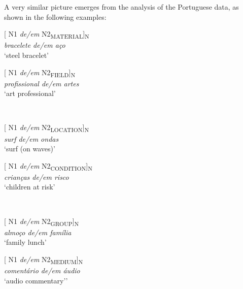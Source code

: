\documentclass[output=paper]{langsci/langscibook}
\begin{document}
A very similar picture emerges from the analysis of the Portuguese data, as shown in the following examples:\\


\begin{minipage}{0.4\textwidth}    %
[ N1 \textit{de/em} N2\textsubscript{MATERIAL}]\textsubscript{N}\\
\textit{bracelete de/em aço}\\
`steel bracelet'
\end{minipage}
\hfill            %
\begin{minipage}{0.4\textwidth}
[ N1 \textit{de/em} N2\textsubscript{FIELD}]\textsubscript{N}\\
\textit{profissional de/em artes}\\
`art professional'
\end{minipage} \\
\hfill  
\vspace{0.5cm}

\begin{minipage}{0.4\textwidth}    %
[ N1 \textit{de/em} N2\textsubscript{LOCATION}]\textsubscript{N}\\
\textit{surf de/em ondas }\\
`surf (on waves)'
\end{minipage}
\hfill            %
\begin{minipage}{0.4\textwidth}
[ N1 \textit{de/em} N2\textsubscript{CONDITION}]\textsubscript{N}\\
\textit{crianças de/em risco}\\
`children at risk'
\end{minipage} \\
\hfill
\vspace{0.5cm}

\begin{minipage}{0.4\textwidth}    %
[ N1 \textit{de/em} N2\textsubscript{GROUP}]\textsubscript{N}\\
\textit{almoço de/em família}\\
`family lunch'
\end{minipage}
\hfill            %
\begin{minipage}{0.4\textwidth}
[ N1 \textit{de/em} N2\textsubscript{MEDIUM}]\textsubscript{N}\\
\textit{comentário de/em áudio}\\
`audio commentary’'
\end{minipage} \\
\hfill
\vspace{0.5cm}
\end{document}
